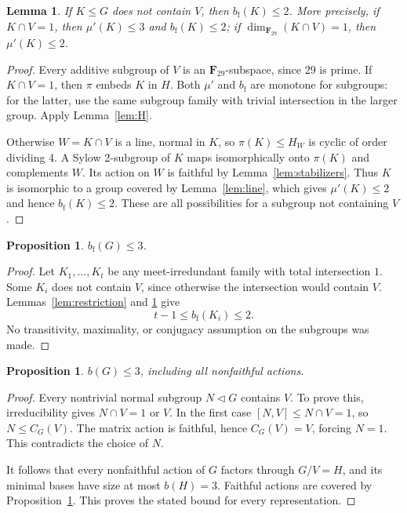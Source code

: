 \documentclass[11pt]{article}
\newtheorem{proposition}[theorem]{Proposition}
\newtheorem{lemma}[theorem]{Lemma}
\theoremstyle{remark}\newtheorem{remark}[theorem]{Remark}
\newcommand{\F}{\mathbf F}
\newcommand{\mup}{\mu'}
\newcommand{\bfth}{b_{\mathrm f}}
\begin{document}
\begin{lemma}\label{lem:properV}
If $K\le G$ does not contain $V$, then $\bfth(K)\le2$. More precisely, if
$K\cap V=1$, then $\mup(K)\le3$ and $\bfth(K)\le2$; if
$\dim_{\F_{29}}(K\cap V)=1$, then $\mup(K)\le2$.
\end{lemma}
\begin{proof}
Every additive subgroup of $V$ is an $\F_{29}$-subspace, since 29 is prime.
If $K\cap V=1$, then $\pi$ embeds $K$ in $H$. Both $\mup$ and $\bfth$ are
monotone for subgroups: for the latter, use the same subgroup family with
trivial intersection in the larger group. Apply Lemma~\ref{lem:H}.

Otherwise $W=K\cap V$ is a line, normal in $K$, so $\pi(K)\le H_W$ is cyclic
of order dividing 4. A Sylow 2-subgroup of $K$ maps isomorphically onto
$\pi(K)$ and complements $W$. Its action on $W$ is faithful by
Lemma~\ref{lem:stabilizers}. Thus $K$ is isomorphic to a group covered by
Lemma~\ref{lem:line}, which gives $\mup(K)\le2$ and hence $\bfth(K)\le2$.
These are all possibilities for a subgroup not containing $V$.
\end{proof}

\newpage
\begin{proposition}\label{prop:faithful}
$\bfth(G)\le3$.
\end{proposition}
\begin{proof}
Let $K_1,\ldots,K_t$ be any meet-irredundant family with total intersection
$1$. Some $K_i$ does not contain $V$, since otherwise the intersection would
contain $V$. Lemmas~\ref{lem:restriction} and \ref{lem:properV} give
\[
                   t-1\le\bfth(K_i)\le2.
\]
No transitivity, maximality, or conjugacy assumption on the subgroups was made.
\end{proof}

\begin{proposition}\label{prop:allactions}
$b(G)\le3$, including all nonfaithful actions.
\end{proposition}
\begin{proof}
Every nontrivial normal subgroup $N\lhd G$ contains $V$. To prove this,
irreducibility gives $N\cap V=1$ or $V$. In the first case
$[N,V]\le N\cap V=1$, so $N\le C_G(V)$. The matrix action is faithful, hence
$C_G(V)=V$, forcing $N=1$. This contradicts the choice of $N$.

It follows that every nonfaithful action of $G$ factors through $G/V=H$,
and its minimal bases have size at most $b(H)=3$. Faithful actions are
covered by Proposition~\ref{prop:faithful}. This proves the stated bound
for every representation.
\end{proof}
\end{document}

